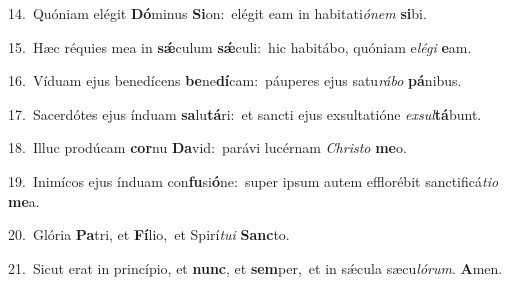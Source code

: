{\numbfont\textcolor{\numbcolor}{14.}}~Quóniam elégit \textbf{Dó}\-minus \textbf{Si}\-on:~\star elégit eam in habitati\-\textit{ó}\-\textit{nem} \textbf{si}\-bi.\par
{\numbfont\textcolor{\numbcolor}{15.}}~Hæc réquies mea in \textbf{sǽ}\-culum \textbf{sǽ}\-culi:~\star hic habitábo, quóniam e\-\textit{lé}\-\textit{gi} \textbf{e}\-am.\par
{\numbfont\textcolor{\numbcolor}{16.}}~Víduam ejus benedícens \textbf{be}\-ne\-\textbf{dí}\-cam:~\star páuperes ejus satu\-\textit{rá}\-\textit{bo} \textbf{pá}\-nibus.\par
{\numbfont\textcolor{\numbcolor}{17.}}~Sacerdótes ejus índuam \textbf{sa}\-lu\-\textbf{tá}\-ri:~\star et sancti ejus exsultatióne \textit{ex}\-\textit{sul}\textbf{tá}bunt.\par
{\numbfont\textcolor{\numbcolor}{18.}}~Illuc prodúcam \textbf{cor}\-nu \textbf{Da}\-vid:~\star parávi lucérnam \textit{Chris}\-\textit{to} \textbf{me}\-o.\par
{\numbfont\textcolor{\numbcolor}{19.}}~Inimícos ejus índuam con\-\textbf{fu}\-si\-\textbf{ó}\-ne:~\star super ipsum autem efflorébit sanctificá\-\textit{ti}\-\textit{o} \textbf{me}\-a.\par
{\numbfont\textcolor{\numbcolor}{20.}}~Glória \textbf{Pa}\-tri, et \textbf{Fí}\-lio,~\star et Spirí\-\textit{tu}\-\textit{i} \textbf{Sanc}\-to.\par
{\numbfont\textcolor{\numbcolor}{21.}}~Sicut erat in princípio, et \textbf{nunc}\-, et \textbf{sem}\-per,~\star et in sǽcula sæcu\-\textit{ló}\-\textit{rum}. \textbf{A}\-men.\par
